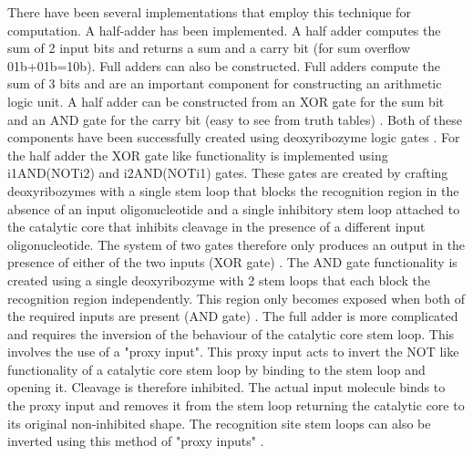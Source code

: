 \documentclass[11pt,a4paper,portrait]{article}
\begin{document}
There have been several implementations that employ this technique for computation. A half-adder has been implemented. A half adder computes the sum of 2 input bits and returns a sum and a carry bit (for sum overflow 01b+01b=10b). Full adders can also be constructed. Full adders compute the sum of 3 bits and are an important component for constructing an arithmetic logic unit. A half adder can be constructed from an XOR gate for the sum bit and an AND gate for the carry bit (easy to see from truth tables) \cite{petzold1999}. Both of these components have been successfully created using deoxyribozyme logic gates \cite{Stojanovic2003} \cite{Lederman2006}. For the half adder the XOR gate like functionality is implemented using i1AND(NOTi2) and i2AND(NOTi1) gates. These gates are created by crafting deoxyribozymes with a single stem loop that blocks the recognition region in the absence of an input oligonucleotide and a single inhibitory stem loop attached to the catalytic core that inhibits cleavage in the presence of a different input oligonucleotide. The system of two gates therefore only produces an output in the presence of either of the two inputs (XOR gate) \cite{Stojanovic2003}. The AND gate functionality is created using a single deoxyribozyme with 2 stem loops that each block the recognition region independently. This region only becomes exposed when both of the required inputs are present (AND gate) \cite{Stojanovic2003}. The full adder is more complicated and requires the inversion of the behaviour of the catalytic core stem loop. This involves the use of a "proxy input". This proxy input acts to invert the NOT like functionality of a catalytic core stem loop by binding to the stem loop and opening it. Cleavage is therefore inhibited. The actual input molecule binds to the proxy input and removes it from the stem loop returning the catalytic core to its original non-inhibited shape. The recognition site stem loops can also be inverted using this method of "proxy inputs" \cite{Lederman2006}.
\clearpage
\end{document}
